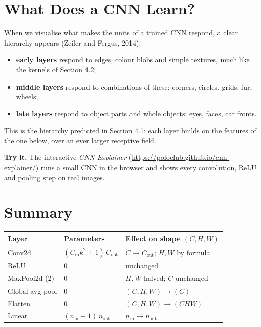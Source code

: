 \documentclass[12pt, a4paper]{article}
\begin{document}
\section{What Does a CNN Learn?}

When we visualise what makes the units of a trained CNN respond, a clear
hierarchy appears (Zeiler and Fergus, 2014):
\begin{itemize}[nosep]
  \item \textbf{early layers} respond to edges, colour blobs and simple
        textures, much like the kernels of Section 4.2;
  \item \textbf{middle layers} respond to combinations of these: corners,
        circles, grids, fur, wheels;
  \item \textbf{late layers} respond to object parts and whole objects: eyes,
        faces, car fronts.
\end{itemize}
This is the hierarchy predicted in Section 4.1: each layer builds on the
features of the one below, over an ever larger receptive field.

\begin{notebox}
  \textbf{Try it.} The interactive \emph{CNN Explainer}
  (\url{https://poloclub.github.io/cnn-explainer/}) runs a small CNN in the
  browser and shows every convolution, ReLU and pooling step on real images.
\end{notebox}

\section{Summary}

\begin{center}
  \renewcommand{\arraystretch}{1.35}
  \begin{tabular}{lll}
    \toprule
    Layer           & Parameters                                 & Effect on shape $(C, H, W)$                \\
    \midrule
    Conv2d          & $(C_{\text{in}} k^2 + 1)\, C_{\text{out}}$ & $C \to C_{\text{out}}$; $H, W$ by formula  \\
    ReLU            & 0                                          & unchanged                                  \\
    MaxPool2d (2)   & 0                                          & $H, W$ halved; $C$ unchanged               \\
    Global avg pool & 0                                          & $(C, H, W) \to (C)$                        \\
    Flatten         & 0                                          & $(C, H, W) \to (C H W)$                    \\
    Linear          & $(n_{\text{in}} + 1)\, n_{\text{out}}$     & $n_{\text{in}} \to n_{\text{out}}$         \\
    \bottomrule
  \end{tabular}
\end{center}
\end{document}
